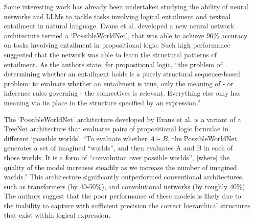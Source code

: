 \documentclass[12pt,twoside]{report}
\begin{document}
Some interesting work has already been undertaken studying the ability of neural networks and LLMs to tackle tasks involving logical entailment and textual entailment in natural language. Evans et al. \cite{Evans2018} developed a new neural network architecture termed a `PossibleWorldNet', that was able to achieve 96\% accuracy on tasks involving entailment in propositional logic. Such high performance suggested that the network was able to learn the structural patterns of entailment. As the authors state, for propositional logic, ``the problem of determining whether an entailment holds is a purely structural sequence-based problem: to evaluate whether an entailment is true, only the meaning of - or inference rules governing - the connectives is relevant. Everything else only has meaning via its place in the structure specified by an expression.'' \cite{Evans2018} \newline \par

The `PossibleWorldNet' architecture developed by Evans et al. is a variant of a TreeNet architecture that evaluates pairs of propositional logic formulae in different `possible worlds'. ``To evaluate whether $A \models B$, the PossibleWorldNet generates a set of imagined “worlds”, and then evaluates A and B in each of those worlds. It is a form of ``convolution over possible worlds'', [where] the quality of the model increases steadily as we increase the number of imagined worlds.'' \cite{Evans2018} This architecture significantly outperformed conventional architectures, such as transformers (by 40-50\%), and convolutional networks (by roughly 40\%). The authors suggest that the poor performance of these models is likely due to the inability to capture with sufficient precision the correct hierarchical structures that exist within logical expression. \newline \par
\end{document}
